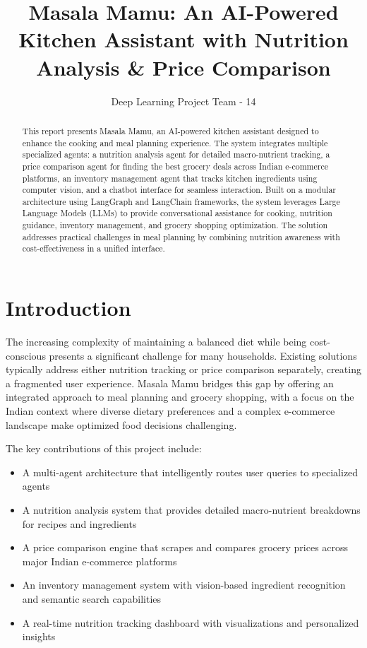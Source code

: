 \documentclass[10pt,twocolumn,letterpaper]{article}
\title{\vspace{-1.25cm}\textbf{Masala Mamu: An AI-Powered Kitchen Assistant with Nutrition Analysis \& Price Comparison}}
\author{Deep Learning Project Team - 14}
\date{}
\begin{document}
\maketitle
\thispagestyle{empty}

\begin{abstract}
This report presents Masala Mamu, an AI-powered kitchen assistant designed to enhance the cooking and meal planning experience. The system integrates multiple specialized agents: a nutrition analysis agent for detailed macro-nutrient tracking, a price comparison agent for finding the best grocery deals across Indian e-commerce platforms, an inventory management agent that tracks kitchen ingredients using computer vision, and a chatbot interface for seamless interaction. Built on a modular architecture using LangGraph and LangChain frameworks, the system leverages Large Language Models (LLMs) to provide conversational assistance for cooking, nutrition guidance, inventory management, and grocery shopping optimization. The solution addresses practical challenges in meal planning by combining nutrition awareness with cost-effectiveness in a unified interface.
\end{abstract}

\section{Introduction}

The increasing complexity of maintaining a balanced diet while being cost-conscious presents a significant challenge for many households. Existing solutions typically address either nutrition tracking or price comparison separately, creating a fragmented user experience. Masala Mamu bridges this gap by offering an integrated approach to meal planning and grocery shopping, with a focus on the Indian context where diverse dietary preferences and a complex e-commerce landscape make optimized food decisions challenging.

The key contributions of this project include:
\begin{itemize}[noitemsep,topsep=0pt]
    \item A multi-agent architecture that intelligently routes user queries to specialized agents
    \item A nutrition analysis system that provides detailed macro-nutrient breakdowns for recipes and ingredients
    \item A price comparison engine that scrapes and compares grocery prices across major Indian e-commerce platforms
    \item An inventory management system with vision-based ingredient recognition and semantic search capabilities
    \item A real-time nutrition tracking dashboard with visualizations and personalized insights
\end{itemize}
\end{document}
